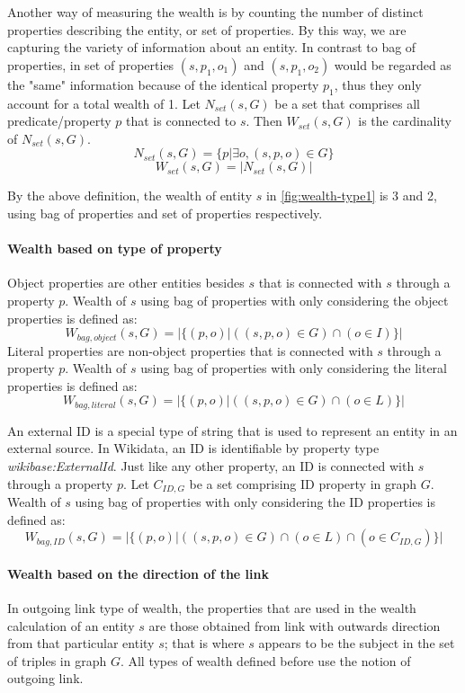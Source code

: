 Another way of measuring the wealth is by counting the number of distinct properties describing the entity, or set of properties. By this way, we are capturing the variety of information about an entity. In contrast to bag of properties, in set of properties \((s, p_1, o_1)\) and \((s, p_1, o_2)\) would be regarded as the "same" information because of the identical property \(p_1\), thus they only account for a total wealth of 1. Let \(N_{set}(s,G)\) be a set that comprises all predicate/property \(p\) that is connected to \(s\). Then \(W_{set}(s, G)\) is the cardinality of \(N_{set}(s,G)\).
\[
    N_{set}(s, G) = \{p | \exists o, (s, p, o) \in G\}
\]
\[
    W_{set}(s, G) = |N_{set}(s,G)|
\]

By the above definition, the wealth of entity \(s\) in \autoref{fig:wealth-type1} is 3 and 2, using bag of properties and set of properties respectively.

\paragraph{Wealth based on type of property}
Object properties are other entities besides \(s\) that is connected with \(s\) through a property \(p\). Wealth of \(s\) using bag of properties with only considering the object properties is defined as:
\[
    W_{bag, object}(s, G) = |\{(p,o) | ((s, p, o) \in G) \cap (o \in I)\}|
\]
Literal properties are non-object properties that is connected with \(s\) through a property \(p\). Wealth of \(s\) using bag of properties with only considering the literal properties is defined as:
\[
    W_{bag, literal}(s, G) = |\{(p,o) | ((s, p, o) \in G) \cap (o \in L)\}|
\]

An external ID is a special type of string that is used to represent an entity in an external source. In Wikidata, an ID is identifiable by property type \textit{wikibase:ExternalId}. Just like any other property, an ID is connected with \(s\) through a property \(p\). Let  \(C_{ID,G}\) be a set comprising ID property in graph \(G\). Wealth of \(s\) using bag of properties with only considering the ID properties is defined as:
\[
    W_{bag, ID}(s, G) = |\{(p,o) | ((s, p, o) \in G) \cap (o \in L) \cap (o \in C_{ID,G})\}|
\]

\paragraph{Wealth based on the direction of the link}
In outgoing link type of wealth, the properties that are used in the wealth calculation of an entity \(s\) are those obtained from link with outwards direction from that particular entity \(s\); that is where \(s\) appears to be the subject in the set of triples in graph \(G\). All types of wealth defined before use the notion of outgoing link.

